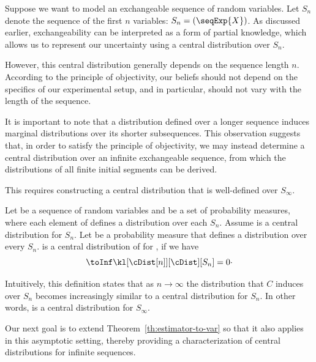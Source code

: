 
Suppose we want to model an exchangeable sequence of random variables.
Let $S_n$ denote the sequence of the first $n$ variables: $S_n = (\seqExp{X})$.
As discussed earlier, exchangeability can be interpreted as a form of partial knowledge, which allows us to
represent our uncertainty using a central distribution over $S_n$.

However, this central distribution generally depends on the sequence length $n$.
According to the principle of objectivity, our beliefs should not depend on the specifics of our experimental setup,
and in particular, should not vary with the length of the sequence.

It is important to note that a distribution defined over a longer sequence induces marginal distributions over its
shorter subsequences.
This observation suggests that, in order to satisfy the principle of objectivity, we may instead determine a central
distribution over an infinite exchangeable sequence, from which the distributions of all finite initial segments can
be derived.

This requires constructing a central distribution that is well-defined over $S_{\infty}$.

\begin{definition}
    \label{def:infseq-central}
    Let  be a sequence of random variables and \setQ be a set of probability measures,
    where each element of \setQ defines a distribution over each $S_n$.
    Assume \cDist[n] is a central distribution for $S_n$.
    Let \cDist be a probability measure that defines a distribution over every $S_n$.
    \cDist is a central distribution of \setQ for , if we have
    \begin{equation*}
        \toInf \kl[{\cDist[n]}][\cDist][S_n] = 0 \cdot
    \end{equation*}
\end{definition}

Intuitively, this definition states that as $n \to \infty$ the distribution that $C$ induces over $S_n$ becomes
increasingly similar to a central distribution for $S_n$.
In other words, \cDist is a central distribution for $S_{\infty}$.

Our next goal is to extend Theorem~\ref{th:estimator-to-var} so that it also applies in this asymptotic setting,
thereby providing a characterization of central distributions for infinite sequences.

